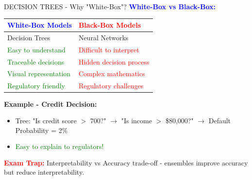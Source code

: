 \documentclass[8pt]{beamer}
\begin{document}
	\begin{frame}{DECISION TREES - Why "White-Box"?}
		\fontsize{6.5}{7.5}\selectfont
		\textcolor{blue}{\textbf{White-Box vs Black-Box:}}
		
		\begin{tabular}{|p{4.0cm}|p{4.0cm}|}
			\hline
			\textcolor{blue}{White-Box Models} & \textcolor{red}{Black-Box Models} \\
			\hline
			Decision Trees & Neural Networks \\
			\hline
			\textcolor{green}{Easy to understand} & \textcolor{red}{Difficult to interpret} \\
			\hline
			\textcolor{green}{Traceable decisions} & \textcolor{red}{Hidden decision process} \\
			\hline
			\textcolor{green}{Visual representation} & \textcolor{red}{Complex mathematics} \\
			\hline
			\textcolor{green}{Regulatory friendly} & \textcolor{red}{Regulatory challenges} \\
			\hline
		\end{tabular}
		
		\textbf{Example - Credit Decision:}
		\begin{itemize}
			\item Tree: "Is credit score $>$ 700?" $\rightarrow$ "Is income $>$ \$80,000?" $\rightarrow$ Default Probability = 2\%
			\item \textcolor{green}{Easy to explain to regulators!}
		\end{itemize}
		
		\textcolor{red}{\textbf{Exam Trap:}} Interpretability vs Accuracy trade-off - ensembles improve accuracy but reduce interpretability.
	\end{frame}
	
\end{document}
